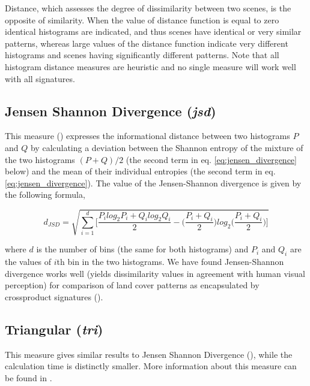 Distance, which assesses the degree of dissimilarity between two scenes, is the opposite of similarity. 
When the value of distance function is equal to zero identical histograms are indicated, and thus scenes have identical or very similar patterns, whereas large values of the distance function indicate very different histograms and scenes having significantly different patterns. 
Note that all histogram distance measures are heuristic and no single measure will work well with all signatures.

\subsection{Jensen Shannon Divergence ({\it jsd})}

This measure (\cite{Lin1991}) expresses the informational distance between two histograms $P$ and $Q$ by calculating a deviation between the Shannon entropy of the mixture of the two histograms $(P+Q)/2$ (the second term in eq. \ref{eq:jensen_divergence} below) and the mean of their individual entropies (the second term in eq. \ref{eq:jensen_divergence}).
The value of the Jensen-Shannon divergence is given by the following formula,

\begingroup
\scriptsize
\begin{equation} \label{eq:jensen_divergence}
d_{JSD}=\sqrt{\sum\limits_{i=1}^{d}{ 
\biggl[\dfrac{P_{i} log_{2} P_{i}+Q_{i} log_{2} Q_{i}}{2}
-\biggl(\dfrac{P_{i}+Q_{i}}{2} \biggr)log_{2} \biggl(\dfrac{P_{i}+Q_{i}}{2} \biggr)\biggr]}}
\end{equation}
\endgroup

\noindent where $d$ is the number of bins (the same for both histograms) and $P_i$ and $Q_i$ are the values of $i$th bin in the two histograms. 
We have found Jensen-Shannon divergence works well (yields dissimilarity values in agreement with human visual perception) for comparison of land cover patterns as encapsulated by crossproduct signatures (\cite{Jasiewicz2013b,Stepinski2014JSTARS,Netzel2015}).

\subsection{Triangular ({\it tri})}
 
This measure gives similar results to Jensen Shannon Divergence (\cite{connor2016tale}), while the calculation time is distinctly smaller.
More information about this measure can be found in \cite{connor2016tale}.

